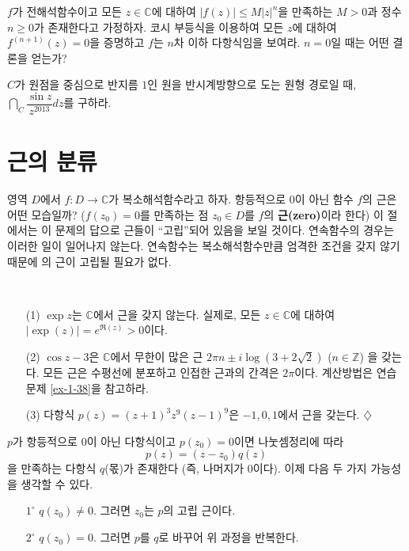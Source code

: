 \begin{salt_exercise} \label{ex-4-15}
$f$가 전해석함수이고 모든 $z\in\mathbb C$에 대하여
$|f(z)| \le M|z|^n$을 만족하는  $M>0$과 정수 $n\ge0$가 존재한다고 가정하자.
코시 부등식을 이용하여 모든 $z$에 대하여 $f^{(n+1)}(z) = 0$을 증명하고
$f$는 $n$차 이하 다항식임을 보여라. $n=0$일 때는 어떤 결론을 얻는가?
\end{salt_exercise}

\begin{salt_exercise} \label{ex-4-16}
$C$가 원점을 중심으로 반지름 $1$인 원을 반시계방향으로 도는 원형 경로일 때,
$\dint_C \dfrac{\sin z}{z^{2013}}dz$를 구하라.
\end{salt_exercise}

\section{근의 분류}

영역 $D$에서  $f: D\to \mathbb C$가 복소해석함수라고 하자.
항등적으로 $0$이 아닌 함수 $f$의 근은 어떤 모습일까?
($f(z_0)=0$를 만족하는 점 $z_0\in D$를 $f$의 {\bf 근(zero)}이라 한다)
이 절에서는 이 문제의 답으로 근들이 ``고립''되어 있음을 보일 것이다.
연속함수의 경우는 이러한 일이 일어나지 않는다. 
연속함수는 복소해석함수만큼 엄격한 조건을 갖지 않기 때문에
의 근이 고립될 필요가 없다.

\begin{saltexample}{}{} \label{example-4-5}
\
\begin{itemize}
\item[(1)] $\exp z$는 $\mathbb C$에서 근을 갖지 않는다.
실제로, 모든 $z\in \mathbb C$에 대하여 $|\exp(z)| = e^{\Re(z)} >0$이다.
\item[(2)] $\cos z - 3$은 $\mathbb C$에서 무한이 많은 근 
$2\pi n \pm i \log(3+2\sqrt{2})$ ($n\in\mathbb Z$)
을 갖는다.
모든 근은 수평선에 분포하고 인접한 근과의 간격은 $2\pi$이다.
계산방법은 연습문제 \ref{ex-1-38}을 참고하라.
\item[(3)] 다항식 $p(z) = (z+1)^3z^9(z-1)^9$은 $-1, 0, 1$에서 근을 갖는다. 
\hfill $\diamondsuit$
\end{itemize}
\end{saltexample}

$p$가 항등적으로 $0$이 아닌 다항식이고 $p(z_0)=0$이면
나눗셈정리에 따라 
\[
p(z) = (z-z_0) q(z)
\]
을 만족하는 다항식 $q$(몫)가 존재한다
(즉, 나머지가 $0$이다). 
이제 다음 두 가지  가능성을 생각할 수 있다.
\begin{itemize}
\item[$1^\circ$] $q(z_0) \ne0$. 그러면 $z_0$는 $p$의 고립 근이다.
\item[$2^\circ$] $q(z_0) =0$. 그러면 $p$를 $q$로 바꾸어 위 과정을 반복한다.
\end{itemize}

